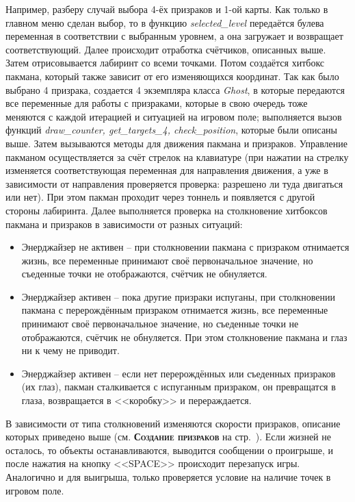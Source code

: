 Например, разберу случай выбора 4-ёх призраков и 1-ой карты. Как только в главном меню сделан выбор, то в функцию \textit{selected\_level} передаётся булева переменная в соответствии с выбранным уровнем, а она загружает и возвращает соответствующий. Далее происходит отработка счётчиков, описанных выше. Затем отрисовывается лабиринт со всеми точками. Потом создаётся хитбокс пакмана, который также зависит от его изменяющихся координат. Так как было выбрано 4 призрака, создается 4 экземпляра класса \textit{Ghost}, в которые передаются все переменные для работы с призраками, которые в свою очередь тоже меняются с каждой итерацией и ситуацией на игровом поле; выполняется вызов функций \textit{draw\_counter, get\_targets\_4, check\_position}, которые были описаны выше. Затем вызываются методы для движения пакмана и призраков. Управление пакманом осуществляется за счёт стрелок на клавиатуре (при нажатии на стрелку изменяется соответствующая переменная для направления движения, а уже в зависимости от направления проверяется проверка: разрешено ли туда двигаться или нет). При этом пакман проходит через тоннель и появляется с другой стороны лабиринта. Далее выполняется проверка на столкновение хитбоксов пакмана и призраков в зависимости от разных ситуаций:
\begin{itemize}
	\item Энерджайзер не активен -- при столкновении пакмана с призраком отнимается жизнь, все переменные принимают своё первоначальное значение, но съеденные точки не отображаются, счётчик не обнуляется.
	\item Энерджайзер активен -- пока другие призраки испуганы, при столкновении пакмана с перерождённым призраком отнимается жизнь, все переменные принимают своё первоначальное значение, но съеденные точки не отображаются, счётчик не обнуляется. При этом столкновение пакмана и глаз ни к чему не приводит.
	\item Энерджайзер активен -- если нет перерождённых или съеденных призраков (их глаз), пакман сталкивается с испуганным призраком, он превращатся в глаза, возвращается в <<коробку>> и перераждается.
\end{itemize}
В зависимости от типа столкновений изменяются скорости призраков, описание которых приведено выше (см. \textbf{\textsc{Создание призраков}} на стр.~\pageref{subsec:ch02/sec01/sub06}). Если жизней не осталось, то объекты останавливаются, выводится сообщении о проигрыше, и после нажатия на кнопку <<SPACE>> происходит перезапуск игры. Аналогично и для выигрыша, только проверяется условие на наличие точек в игровом поле.
 
